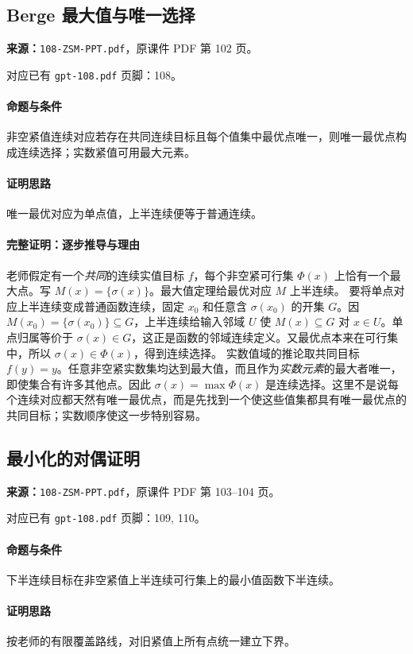 \clearpage\subsection{Berge 最大值与唯一选择}
\textbf{来源：}\texttt{108-ZSM-PPT.pdf}，原课件 PDF 第 102 页。\par
对应已有 \texttt{gpt-108.pdf} 页脚：108。\par
\paragraph{命题与条件}非空紧值连续对应若存在共同连续目标且每个值集中最优点唯一，则唯一最优点构成连续选择；实数紧值可用最大元素。
\paragraph{证明思路}唯一最优对应为单点值，上半连续便等于普通连续。
\paragraph{完整证明：逐步推导与理由}

老师假定有一个\emph{共同}的连续实值目标 $f$，每个非空紧可行集 $\Phi(x)$ 上恰有一个最大点。写 $M(x)=\{\sigma(x)\}$。最大值定理给最优对应 $M$ 上半连续。
要将单点对应上半连续变成普通函数连续，固定 $x_0$ 和任意含 $\sigma(x_0)$ 的开集 $G$。因 $M(x_0)=\{\sigma(x_0)\}\subseteq G$，上半连续给输入邻域 $U$ 使 $M(x)\subseteq G$ 对 $x\in U$。单点归属等价于 $\sigma(x)\in G$，这正是函数的邻域连续定义。又最优点本来在可行集中，所以 $\sigma(x)\in\Phi(x)$，得到连续选择。
实数值域的推论取共同目标 $f(y)=y$。任意非空紧实数集均达到最大值，而且作为\emph{实数元素}的最大者唯一，即使集合有许多其他点。因此 $\sigma(x)=\max\Phi(x)$ 是连续选择。这里不是说每个连续对应都天然有唯一最优点，而是先找到一个使这些值集都具有唯一最优点的共同目标；实数顺序使这一步特别容易。

\clearpage\subsection{最小化的对偶证明}
\textbf{来源：}\texttt{108-ZSM-PPT.pdf}，原课件 PDF 第 103--104 页。\par
对应已有 \texttt{gpt-108.pdf} 页脚：109, 110。\par
\paragraph{命题与条件}下半连续目标在非空紧值上半连续可行集上的最小值函数下半连续。
\paragraph{证明思路}按老师的有限覆盖路线，对旧紧值上所有点统一建立下界。
